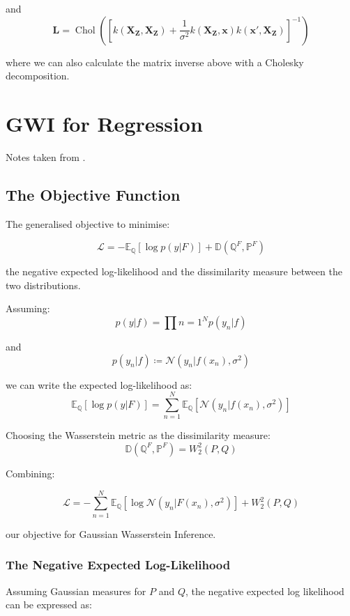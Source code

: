 \documentclass[twoside,11pt]{article}
\newcommand{\Chol}{\operatorname{Chol}}
\begin{document}
and
\[\mathbf{L} = \Chol\left( \left[k(\mathbf{X}_{\mathbf{Z}}, \mathbf{X}_{\mathbf{Z}}) + \frac{1}{\sigma^2} k(\mathbf{X}_{\mathbf{Z}}, \mathbf{x})k(\mathbf{x}', \mathbf{X}_{\mathbf{Z}})\right]^{-1}\right)\]

where we can also calculate the matrix inverse above with a Cholesky decomposition.

\section{GWI for Regression}\label{sec:gwi-for-regression}

Notes taken from \cite{wild2022generalized}.

\subsection{The Objective Function}\label{subsec:gwi-for-regression-the-liss}


The generalised objective to minimise:

\[\mathcal{L} = - \mathbb{E}_{\mathbb{Q}}\left[ \log p(y |F)\right] + \mathbb{D}(\mathbb{Q}^F, \mathbb{P}^F)\]

the negative expected log-likelihood and the dissimilarity measure between the two distributions.

Assuming:
\[p(y|f) = \prod{n=1}^N p(y_n | f)\]

and
\[p(y_n | f) \coloneqq \mathcal{N}(y_n| f(x_n), \sigma^2)\]

we can write the expected log-likelihood as:
\[\mathbb{E}_{\mathbb{Q}}\left[ \log p(y |F)\right] =\sum_{n=1}^N \mathbb{E}_{\mathbb{Q}}\left[\mathcal{N}(y_n| f(x_n), \sigma^2)\right]\]

Choosing the Wasserstein metric as the dissimilarity measure:
\[\mathbb{D}(\mathbb{Q}^F, \mathbb{P}^F) = W_2^2(P, Q)\]

Combining:

\[\mathcal{L} = - \sum_{n=1}^N \mathbb{E}_{\mathbb{Q}}\left[ \log \mathcal{N}(y_n |F(x_n), \sigma^2)\right] + W_2^2(P, Q)\]

our objective for Gaussian Wasserstein Inference.

\subsubsection{The Negative Expected Log-Likelihood}

Assuming Gaussian measures for $P$ and $Q$, the negative expected log likelihood can be expressed as:
\end{document}
